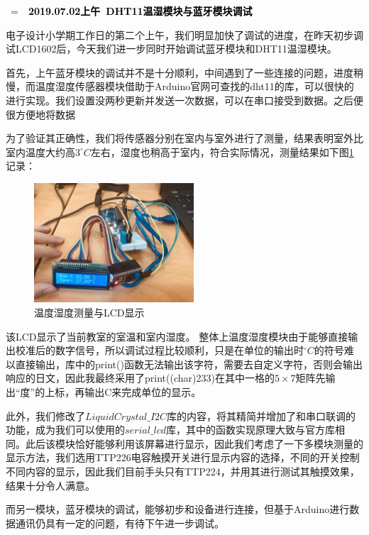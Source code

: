 \documentclass[a4paper, 11pt]{article} %
\makeatletter
\newlength\sidebar
\newlength\envborder
\def\esefcolorbox#1#{\esecolor@fbox{#1}}
\def\esecolor@fbox#1#2#3{%
   \color@b@x{\fboxsep\z@\color#1{#2}\fboxs}{\color#1{#3}}}
\newenvironment{eseframed}{%
   \def\FrameCommand{\fboxrule=\the\sidebar  \fboxsep=\the\envborder%
   \esefcolorbox{exampleborder}{examplebg}}%
   \MakeFramed{\FrameRestore}}%
  {\endMakeFramed}
\newcounter{diary}
\newenvironment{diary}[2]
 {\par\medskip\refstepcounter{diary}%
 \hbox{%
 \fboxsep=\the\sidebar\hspace{-\envborder}\hspace{-0.5\sidebar}%
 \colorbox{exampleborder}{%
 \hspace{\envborder}\footnotesize\sffamily\bfseries%
 \textcolor{black}{{#1}\ {#2}\enspace\hspace{\envborder}}
 }
 }
 \nointerlineskip\vspace{-\topsep}%
 \begin{eseframed}\noindent\ignorespaces%
 }
 {\end{eseframed}\vspace{-\baselineskip}\medskip}
\makeatother
\begin{document}
  \begin{diary}{2019.07.02上午}{DHT11温湿模块与蓝牙模块调试}
  \par{}电子设计小学期工作日的第二个上午，我们明显加快了调试的进度，在昨天初步调试LCD1602后，今天我们进一步同时开始调试蓝牙模块和DHT11温湿模块。
  
  首先，上午蓝牙模块的调试并不是十分顺利，中间遇到了一些连接的问题，进度稍慢，而温度湿度传感器模块借助于Arduino官网可查找的dht11的库，可以很快的进行实现。我们设置没两秒更新并发送一次数据，可以在串口接受到数据。之后便很方便地将数据
  
  为了验证其正确性，我们将传感器分别在室内与室外进行了测量，结果表明室外比室内温度大约高$3^\circ C$左右，湿度也稍高于室内，符合实际情况，测量结果如下图\ref{img1}记录：
  \begin{figure}[H]
    \centering
    \includegraphics[width = 0.53\textwidth]{temp1.jpg}
    \caption{温度湿度测量与LCD显示}
    \label{img1}
  \end{figure}
  
  该LCD显示了当前教室的室温和室内湿度。
  整体上温度湿度模块由于能够直接输出校准后的数字信号，所以调试过程比较顺利，只是在单位的输出时$^{\circ}C$的符号难以直接输出，库中的print()函数无法输出该字符，需要去自定义字符，否则会输出响应的日文，因此我最终采用了print((char)233)在其中一格的$5\times 7$矩阵先输出“度”的上标，再输出C来完成单位的显示。
  
  此外，我们修改了$LiquidCrystal\_I2C$库的内容，将其精简并增加了和串口联调的功能，成为我们可以使用的$serial\_lcd$库，其中的函数实现原理大致与官方库相同。此后该模块恰好能够利用该屏幕进行显示，因此我们考虑了一下多模块测量的显示方法，我们选用TTP226电容触摸开关进行显示内容的选择，不同的开关控制不同内容的显示，因此我们目前手头只有TTP224，并用其进行测试其触摸效果，结果十分令人满意。
  
  而另一模块，蓝牙模块的调试，能够初步和设备进行连接，但基于Arduino进行数据通讯仍具有一定的问题，有待下午进一步调试。
  
  \end{diary}
  
\end{document}
